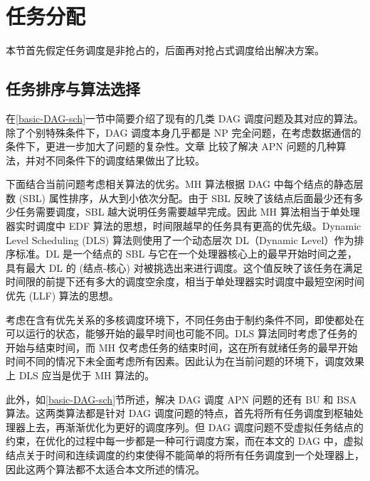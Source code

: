 




\section{任务分配}

本节首先假定任务调度是非抢占的，后面再对抢占式调度给出解决方案。

\subsection{任务排序与算法选择}


在\ref{basic-DAG-sch}一节中简要介绍了现有的几类 DAG 调度问题及其对应的算法。除了个别特殊条件下，DAG 调度本身几乎都是 NP 完全问题，在考虑数据通信的条件下，更进一步加大了问题的复杂性。文章 \cite{Comparison} 比较了解决 APN 问题的几种算法，并对不同条件下的调度结果做出了比较。%

下面结合当前问题考虑相关算法的优劣。MH 算法根据 DAG 中每个结点的静态层数 (SBL) 属性排序，从大到小依次分配。由于 SBL 反映了该结点后面最少还有多少任务需要调度，SBL 越大说明任务需要越早完成。因此 MH 算法相当于单处理器实时调度中 EDF 算法的思想，时间限越早的任务具有更高的优先级。Dynamic Level Scheduling (DLS) 算法则使用了一个动态层次 DL（Dynamic Level）作为排序标准。DL 是一个结点的 SBL 与它在一个处理器核心上的最早开始时间之差，具有最大 DL 的 (结点-核心) 对被挑选出来进行调度。这个值反映了该任务在满足时间限的前提下还有多大的调度空余度，相当于单处理器实时调度中最短空闲时间优先 (LLF) 算法的思想。

考虑在含有优先关系的多核调度环境下，不同任务由于制约条件不同，即使都处在可以运行的状态，能够开始的最早时间也可能不同。DLS 算法同时考虑了任务的开始与结束时间，而 MH 仅考虑任务的结束时间，这在所有就绪任务的最早开始时间不同的情况下未全面考虑所有因素。因此认为在当前问题的环境下，调度效果上 DLS 应当是优于 MH 算法的。

此外，如\ref{basic-DAG-sch}节所述，解决 DAG 调度 APN 问题的还有 BU 和 BSA 算法。这两类算法都是针对 DAG 调度问题的特点，首先将所有任务调度到枢轴处理器上去，再渐渐优化为更好的调度序列。但 DAG 调度问题不受虚拟任务结点的约束，在优化的过程中每一步都是一种可行调度方案，而在本文的 DAG 中，虚拟结点关于时间和连续调度的约束使得不能简单的将所有任务调度到一个处理器上，因此这两个算法都不太适合本文所述的情况。

